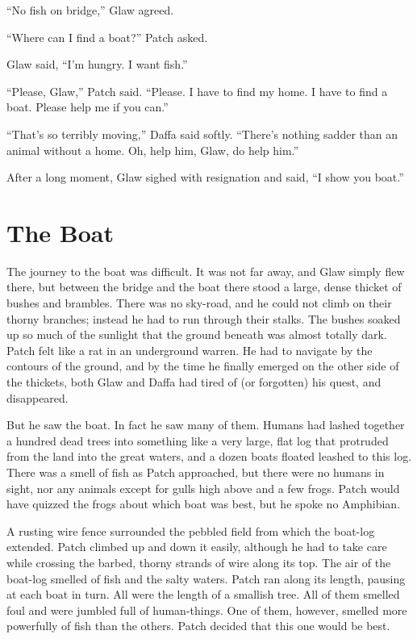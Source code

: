 \documentclass[ebook,oneside,openany,12pt]{memoir}
\begin{document}
“No fish on bridge,” Glaw agreed.

“Where can I find a boat?” Patch asked.

Glaw said, “I’m hungry. I want fish.”

“Please, Glaw,” Patch said. “Please. I have to find my home. I have to
find a boat. Please help me if you can.”

“That’s so terribly moving,” Daffa said softly. “There’s nothing
sadder than an animal without a home. Oh, help him, Glaw, do help
him.”

After a long moment, Glaw sighed with resignation and said, “I show
you boat.”


\section{The Boat}

The journey to the boat was difficult. It was not far away, and Glaw
simply flew there, but between the bridge and the boat there stood a
large, dense thicket of bushes and brambles. There was no sky-road,
and he could not climb on their thorny branches; instead he had to run
through their stalks. The bushes soaked up so much of the sunlight
that the ground beneath was almost totally dark. Patch felt like a rat
in an underground warren. He had to navigate by the contours of the
ground, and by the time he finally emerged on the other side of the
thickets, both Glaw and Daffa had tired of (or forgotten) his quest,
and disappeared.

But he saw the boat. In fact he saw many of them. Humans had lashed
together a hundred dead trees into something like a very large, flat
log that protruded from the land into the great waters, and a dozen
boats floated leashed to this log. There was a smell of fish as Patch
approached, but there were no humans in sight, nor any animals except
for gulls high above and a few frogs. Patch would have quizzed the
frogs about which boat was best, but he spoke no Amphibian.

A rusting wire fence surrounded the pebbled field from which the
boat-log extended. Patch climbed up and down it easily, although he
had to take care while crossing the barbed, thorny strands of wire
along its top. The air of the boat-log smelled of fish and the salty
waters. Patch ran along its length, pausing at each boat in turn. All
were the length of a smallish tree. All of them smelled foul and were
jumbled full of human-things. One of them, however, smelled more
powerfully of fish than the others. Patch decided that this one would
be best.
\end{document}
